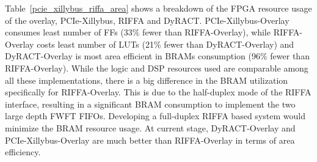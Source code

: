 Table~\ref{pcie_xillybus_riffa_area} shows a breakdown of the FPGA resource usage of the overlay, PCIe-Xillybus, RIFFA and DyRACT. 
PCIe-Xillybus-Overlay consumes least number of FFs (33\% fewer than RIFFA-Overlay), while RIFFA-Overlay costs least number of LUTs (21\% fewer than DyRACT-Overlay) and DyRACT-Overlay is most area efficient in BRAMs consumption (96\% fewer than RIFFA-Overlay). 
While the logic and DSP resources used are comparable among all these implementations, there is a big difference in the BRAM utilization specifically for RIFFA-Overlay.
This is due to the half-duplex mode of the RIFFA interface, resulting in a significant BRAM consumption to implement the two large depth FWFT FIFOs. 
Developing a full-duplex RIFFA based system would minimize the BRAM resource usage. 
At current stage, DyRACT-Overlay and PCIe-Xillybus-Overlay are much better than RIFFA-Overlay in terms of area efficiency. 
 
\begin{table}[tb]
	\caption{Area overhead of PCIe-based systems.}
	\label{pcie_xillybus_riffa_area}
	\centering
\end{table}
